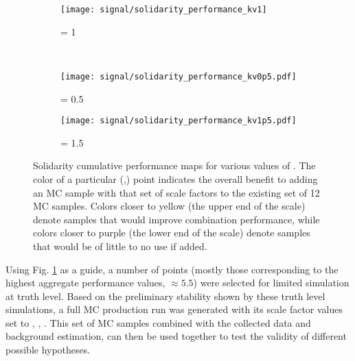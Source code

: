     \begin{figure}[tbh]
        \begin{subfigure}{0.5\textwidth}
            \texttt{[image: signal/solidarity\_performance\_kv1]}
            \captionsetup{justification=centering} \caption{\kv = 1}
        \end{subfigure}\\
        \begin{subfigure}{0.5\textwidth}
            \texttt{[image: signal/solidarity\_performance\_kv0p5.pdf]}
            \captionsetup{justification=centering} \caption{\kv = 0.5}
        \end{subfigure}
        \begin{subfigure}{0.5\textwidth}
            \texttt{[image: signal/solidarity\_performance\_kv1p5.pdf]}
            \captionsetup{justification=centering} \caption{\kv = 1.5}
        \end{subfigure}
        \caption{
            Solidarity cumulative performance maps for various values of \kv.
            The color of a particular (\kvv,\kl) point indicates the overall
                benefit to adding an MC sample with that set of scale factors
                to the existing set of 12 MC samples.
            Colors closer to yellow (the upper end of the scale) denote samples that would improve combination performance,
                while colors closer to purple (the lower end of the scale) denote samples that would be of little to no use if added.
        }
        \label{fig:solidarity_performance_map}
    \end{figure}

    Using Fig. \ref{fig:solidarity_performance_map} as a guide,
        a number of points (mostly those corresponding to the highest aggregate performance values, $\approx 5.5$)
        were selected for limited simulation at truth level.
    Based on the preliminary stability shown by these truth level simulations,
        a full MC production run was generated with its scale factor values set to , , .
    This set of MC samples combined with the collected data and background estimation,
        can then be used together to test the validity of different possible hypotheses.


%
